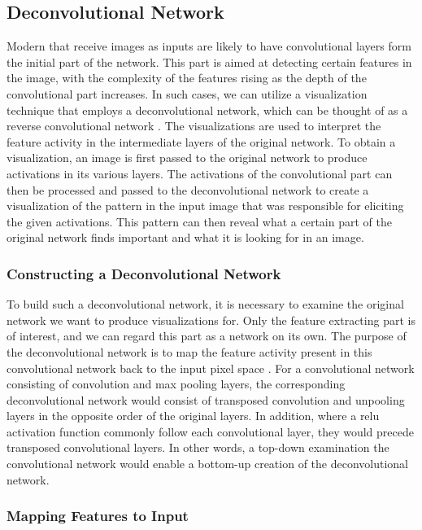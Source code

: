 \subsection{Deconvolutional Network} \label{sec:deconv-net}

Modern  that receive images as inputs are likely to have convolutional layers form the initial part of the network. This part is aimed at detecting certain features in the image, with the complexity of the features rising as the depth of the convolutional part increases. In such cases, we can utilize a visualization technique that employs a deconvolutional network, which can be thought of as a reverse convolutional network \cite{deconv-net-article}. The visualizations are used to interpret the feature activity in the intermediate layers of the original network. To obtain a visualization, an image is first passed to the original network to produce activations in its various layers. The activations of the convolutional part can then be processed and passed to the deconvolutional network to create a visualization of the pattern in the input image that was responsible for eliciting the given activations. This pattern can then reveal what a certain part of the original network finds important and what it is looking for in an image.

\subsubsection{Constructing a Deconvolutional Network}

To build such a deconvolutional network, it is necessary to examine the original network we want to produce visualizations for. Only the feature extracting part is of interest, and we can regard this part as a network on its own. The purpose of the deconvolutional network is to map the feature activity present in this convolutional network back to the input pixel space \cite{deconv-vis-article}. For a convolutional network consisting of convolution and max pooling layers, the corresponding deconvolutional network would consist of transposed convolution and unpooling layers in the opposite order of the original layers. In addition, where a \acrshort{relu} activation function commonly follow each convolutional layer, they would precede transposed convolutional layers. In other words, a top-down examination the convolutional network would enable a bottom-up creation of the deconvolutional network. 

\subsubsection{Mapping Features to Input}

